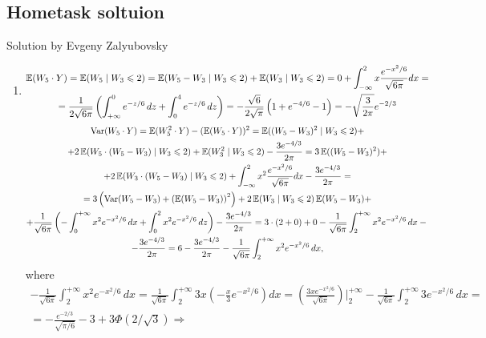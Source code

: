 \documentclass[12pt, a4paper]{article}
\begin{document}
\subsection{Hometask soltuion}

Solution by Evgeny Zalyubovsky

\begin{enumerate}
	\item
\begin{multline*}
	\operatorname{\mathbb{E}}(W_5 \cdot Y) = \operatorname{\mathbb{E}}(W_5 \mid W_3 \leqslant 2) = \operatorname{\mathbb{E}}(W_5 - W_3 \mid W_3 \leqslant 2) + \operatorname{\mathbb{E}}(W_3 \mid W_3 \leqslant 2) = 0 + \int_{-\infty}^{2} x\dfrac{e^{-x^2/6}}{\sqrt{6\pi}} dx =\\= \frac{1}{2\sqrt{6\pi}} \left(\int_{+\infty}^{0} e^{-z/6}\,dz + \int_0^{4} e^{-z/6}\,dz\right) = -\frac{\sqrt{6}}{2\sqrt{\pi}} \left(1 + e^{-4/6} - 1\right) = -\sqrt{\frac{3}{2\pi}} e^{-2/3}
\end{multline*}
\begin{multline*}
	\operatorname{Var}(W_5 \cdot Y) = \operatorname{\mathbb{E}}(W_5^2 \cdot Y) - (\operatorname{\mathbb{E}}(W_5 \cdot Y))^2 = \operatorname{\mathbb{E}}((W_5 - W_3)^2 \mid W_3 \leqslant 2) +\\
	+ 2\operatorname{\mathbb{E}}(W_5 \cdot (W_5 - W_3) \mid W_3 \leqslant 2) + \operatorname{\mathbb{E}}(W_3^2 \mid W_3 \leqslant 2) - \frac{3e^{-4/3}}{2\pi} =
	3\operatorname{\mathbb{E}}((W_5 - W_3)^2) +\\
	+ 2\operatorname{\mathbb{E}}(W_3 \cdot (W_5 - W_3) \mid W_3 \leqslant 2) + \int_{-\infty}^{2} x^2 \frac{e^{-x^2/6}}{\sqrt{6\pi}} dx - \frac{3e^{-4/3}}{2\pi} =\\
	= 3 \left(\operatorname{Var}(W_5 - W_3) + \left(\operatorname{\mathbb{E}}(W_5 - W_3)\right)^2\right) + 2 \operatorname{\mathbb{E}}(W_3 \mid W_3 \leqslant 2) \operatorname{\mathbb{E}}(W_5 - W_3) +\\
	+ \frac{1}{\sqrt{6\pi}} \left(-\int_0^{+\infty} x^2 e^{-x^2/6}\,dx + \int_0^{2} x^2 e^{-x^2/6}\,dz\right) - \frac{3e^{-4/3}}{2\pi} = 3 \cdot (2 + 0) + 0 - \frac{1}{\sqrt{6\pi}} \int_{2}^{+\infty} x^2 e^{-x^2/6}\,dx -{}\\
	- \frac{3e^{-4/3}}{2\pi} = 6 - \frac{3e^{-4/3}}{2\pi} - \frac{1}{\sqrt{6\pi}} \int_{2}^{+\infty} x^2 e^{-x^2/6}\,dx,
\end{multline*}
where
\begin{multline*}
-\frac{1}{\sqrt{6\pi}} \int_{2}^{+\infty} x^2 e^{-x^2/6}\,dx = \frac{1}{\sqrt{6\pi}} \int_{2}^{+\infty} 3x \left(-\frac{x}{3} e^{-x^2/6}\right) dx = \left(\frac{3xe^{-x^2/6}}{\sqrt{6\pi}}\right)\bigg|_{2}^{+\infty} - \frac{1}{\sqrt{6\pi}} \int_{2}^{+\infty} 3e^{-x^2/6}\,dx =\\= -\frac{e^{-2/3}}{\sqrt{\pi/6}} - 3 + 3\Phi\left(2/\sqrt{3}\right) \Rightarrow

\end{multline*}
\end{enumerate}
\end{document}
